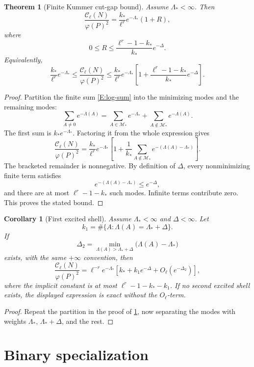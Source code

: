 \documentclass[11pt]{article}
\newtheorem{theorem}{Theorem}
\newtheorem{corollary}{Corollary}
\begin{document}
\begin{theorem}[Finite Kummer cut-gap bound]\label{T:cut-gap}
Assume \(\Lambda_*<\infty\).  Then
\[
\frac{\mathcal C_\ell(N)}{\varphi(P)^2}
=
\frac{k_*}{\ell^r}e^{-\Lambda_*}(1+R),
\]
where
\[
0\le R\le
\frac{\ell^r-1-k_*}{k_*}e^{-\Delta}.
\]
Equivalently,
\[
\frac{k_*}{\ell^r}e^{-\Lambda_*}
\le
\frac{\mathcal C_\ell(N)}{\varphi(P)^2}
\le
\frac{k_*}{\ell^r}e^{-\Lambda_*}
\left[
1+
\frac{\ell^r-1-k_*}{k_*}e^{-\Delta}
\right].
\]
\end{theorem}

\begin{proof}
Partition the finite sum \eqref{E:log-sum} into the minimizing modes and the remaining modes:
\[
\sum_{A\ne0}e^{-\Lambda(A)}
=
\sum_{A\in\mathcal M_*}e^{-\Lambda_*}
+
\sum_{A\notin\mathcal M_*}e^{-\Lambda(A)}.
\]
The first sum is \(k_*e^{-\Lambda_*}\).  Factoring it from the whole expression gives
\[
\frac{\mathcal C_\ell(N)}{\varphi(P)^2}
=
\frac{k_*}{\ell^r}e^{-\Lambda_*}
\left[
1+
\frac1{k_*}\sum_{A\notin\mathcal M_*}
e^{-(\Lambda(A)-\Lambda_*)}
\right].
\]
The bracketed remainder is nonnegative.  By definition of \(\Delta\), every nonminimizing finite term satisfies
\[
e^{-(\Lambda(A)-\Lambda_*)}\le e^{-\Delta},
\]
and there are at most \(\ell^r-1-k_*\) such modes.  Infinite terms contribute zero.  This proves the stated bound.
\end{proof}

\begin{corollary}[First excited shell]\label{C:first-shell}
Assume \(\Lambda_*<\infty\) and \(\Delta<\infty\).  Let
\[
k_1=\#\{A:\Lambda(A)=\Lambda_*+\Delta\}.
\]
If
\[
\Delta_2=\min_{\Lambda(A)>\Lambda_*+\Delta}
\bigl(\Lambda(A)-\Lambda_*\bigr)
\]
exists, with the same \(+\infty\) convention, then
\[
\frac{\mathcal C_\ell(N)}{\varphi(P)^2}
=
\ell^{-r}e^{-\Lambda_*}
\left[
k_*+k_1e^{-\Delta}
+O_\ell(e^{-\Delta_2})
\right],
\]
where the implicit constant is at most \(\ell^r-1-k_*-k_1\).  If no second excited shell exists, the displayed expression is exact without the \(O_\ell\)-term.
\end{corollary}

\begin{proof}
Repeat the partition in the proof of \cref{T:cut-gap}, now separating the modes with weights \(\Lambda_*\), \(\Lambda_*+\Delta\), and the rest.
\end{proof}

\section{Binary specialization}
\end{document}
